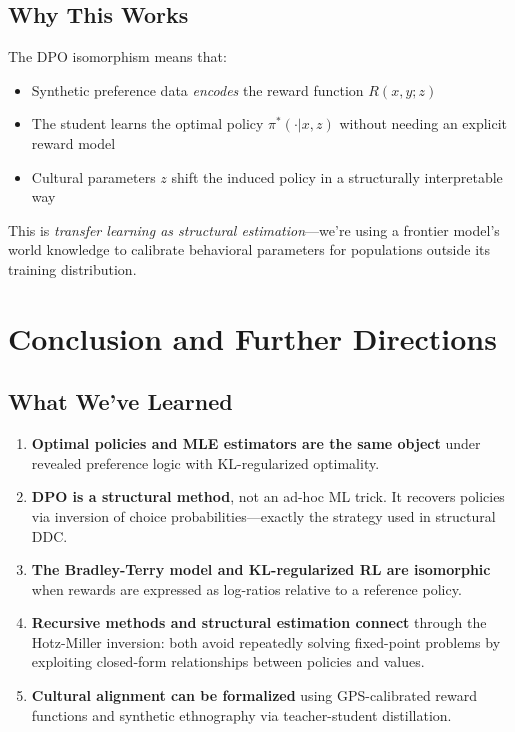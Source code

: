 \documentclass[11pt]{article}
\newcommand{\1}{\mathbf{1}}
\theoremstyle{plain}
\theoremstyle{definition}
\theoremstyle{remark}
\begin{document}
\subsection{Why This Works}

The DPO isomorphism means that:
\begin{itemize}
\item Synthetic preference data \emph{encodes} the reward function $R(x,y;z)$
\item The student learns the optimal policy $\pi^*(\cdot|x,z)$ without needing an explicit reward model
\item Cultural parameters $z$ shift the induced policy in a structurally interpretable way
\end{itemize}

This is \emph{transfer learning as structural estimation}—we're using a frontier model's world knowledge to calibrate behavioral parameters for populations outside its training distribution.

\newpage
\section{Conclusion and Further Directions}

\subsection{What We've Learned}

\begin{enumerate}
\item \textbf{Optimal policies and MLE estimators are the same object} under revealed preference logic with KL-regularized optimality.

\item \textbf{DPO is a structural method}, not an ad-hoc ML trick. It recovers policies via inversion of choice probabilities—exactly the strategy used in structural DDC.

\item \textbf{The Bradley-Terry model and KL-regularized RL are isomorphic} when rewards are expressed as log-ratios relative to a reference policy.

\item \textbf{Recursive methods and structural estimation connect} through the Hotz-Miller inversion: both avoid repeatedly solving fixed-point problems by exploiting closed-form relationships between policies and values.

\item \textbf{Cultural alignment can be formalized} using GPS-calibrated reward functions and synthetic ethnography via teacher-student distillation.
\end{enumerate}
\end{document}
